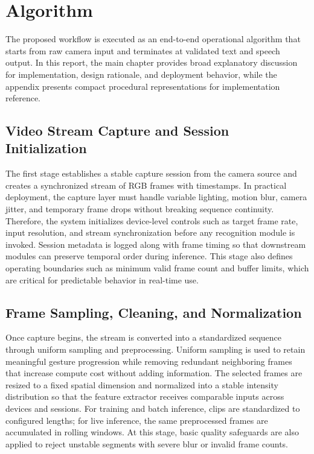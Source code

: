 \section{Algorithm}
The proposed workflow is executed as an end-to-end operational algorithm that starts from raw camera input and terminates at validated text and speech output. In this report, the main chapter provides broad explanatory discussion for implementation, design rationale, and deployment behavior, while the appendix presents compact procedural representations for implementation reference.

\subsection{Video Stream Capture and Session Initialization}
The first stage establishes a stable capture session from the camera source and creates a synchronized stream of RGB frames with timestamps. In practical deployment, the capture layer must handle variable lighting, motion blur, camera jitter, and temporary frame drops without breaking sequence continuity. Therefore, the system initializes device-level controls such as target frame rate, input resolution, and stream synchronization before any recognition module is invoked. Session metadata is logged along with frame timing so that downstream modules can preserve temporal order during inference. This stage also defines operating boundaries such as minimum valid frame count and buffer limits, which are critical for predictable behavior in real-time use.

\subsection{Frame Sampling, Cleaning, and Normalization}
Once capture begins, the stream is converted into a standardized sequence through uniform sampling and preprocessing. Uniform sampling is used to retain meaningful gesture progression while removing redundant neighboring frames that increase compute cost without adding information. The selected frames are resized to a fixed spatial dimension and normalized into a stable intensity distribution so that the feature extractor receives comparable inputs across devices and sessions. For training and batch inference, clips are standardized to configured lengths; for live inference, the same preprocessed frames are accumulated in rolling windows. At this stage, basic quality safeguards are also applied to reject unstable segments with severe blur or invalid frame counts.

